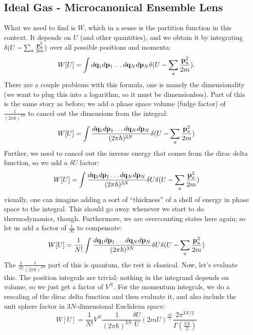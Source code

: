 \subsection{Ideal Gas - Microcanonical Ensemble Lens}
What we need to find is $W$, which in a sense is the partition function in this context. It depends on $U$ (and other quantities), and we obtain it by integrating $\delta(U - \sum_a \frac{\mathbf{p}_a^2}{2m})$ over all possible positions and momenta:
\begin{equation}
    W[U] = \int d\mathbf{q}_1d\mathbf{p}_1 \ldots d\mathbf{q}_Nd\mathbf{p}_N \delta(U - \sum_a \frac{\mathbf{p}_a^2}{2m}).
\end{equation}
There are a couple problems with this formula, one is namely the dimensionality (we want to plug this into a logarithm, so it must be dimensionless). Part of this is the same story as before; we add a phase space volume (fudge factor) of $\frac{1}{(2\pi\hbar)^{3N}}$ to cancel out the dimensions from the integral:
\begin{equation}
    W[U] = \int \frac{d\mathbf{q}_1d\mathbf{p}_1 \ldots d\mathbf{q}_Nd\mathbf{p}_N}{(2\pi\hbar)^{3N}} \delta(U - \sum_a \frac{\mathbf{p}_a^2}{2m})
\end{equation}
Further, we need to cancel out the inverse energy that comes from the dirac delta function, so we add a $\delta U$ factor:
\begin{equation}
    W[U] = \int \frac{d\mathbf{q}_1d\mathbf{p}_1 \ldots d\mathbf{q}_Nd\mathbf{p}_N}{(2\pi\hbar)^{3N}} \delta U\delta(U - \sum_a \frac{\mathbf{p}_a^2}{2m})
\end{equation} 
visually, one can imagine adding a sort of ``thickness'' of a shell of energy in phase space to the integral. This should go away whenever we start to do thermodynamics, though. Furthermore, we are overcounting states here again; so let us add a factor of $\frac{1}{N!}$ to compensate:
\begin{equation}
    W[U] = \frac{1}{N!}\int \frac{d\mathbf{q}_1d\mathbf{p}_1 \ldots d\mathbf{q}_Nd\mathbf{p}_N}{(2\pi\hbar)^{3N}} \delta U\delta(U - \sum_a \frac{\mathbf{p}_a^2}{2m})
\end{equation}
The $\frac{1}{N!}\frac{1}{(2\pi\hbar)^{3N}}$ part of this is quantum, the rest is classical. Now, let's evaluate this. The position integrals are trivial; nothing in the integrand depends on volume, so we just get a factor of $V^N$. For the momentum integrals, we do a rescaling of the dirac delta function and then evaluate it, and also include the unit sphere factor in $3N$-dimensional Euclidean space:
\begin{equation}
    W[U] = \frac{1}{N!}V^N \frac{1}{(2\pi \hbar)^{3N}}\frac{\delta U}{U}(2mU)^{\frac{3N}{2}}\frac{2\pi^{3N/2}}{\Gamma(\frac{3N}{2})}
\end{equation}
